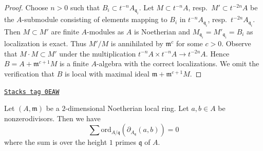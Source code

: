 \begin{proof}
Choose $n > 0$ such that $B_i \subset t^{-n}A_{\mathfrak q_i}$.
Let $M \subset t^{-n}A$, resp.\ $M' \subset t^{-2n}A$ be the
$A$-submodule consisting of elements mapping to $B_i$ in
$t^{-n}A_{\mathfrak q_i}$, resp.\ $t^{-2n}A_{\mathfrak q_i}$.
Then $M \subset M'$ are finite $A$-modules as $A$ is Noetherian
and $M_{\mathfrak q_i} = M'_{\mathfrak q_i} = B_i$ as localization
is exact. Thus $M'/M$ is annihilated by $\mathfrak m^c$ for some
$c > 0$. Observe that $M \cdot M \subset M'$ under the multiplication
$t^{-n}A \times t^{-n}A \to t^{-2n}A$. Hence
$B = A + \mathfrak m^{c + 1}M$ is a finite $A$-algebra with the correct
localizations. We omit the verification that $B$ is local with
maximal ideal $\mathfrak m + \mathfrak m^{c + 1}M$.
\end{proof}

\begin{lemma}
\label{chow-lemma-key-nonzerodivisors}
\href{https://stacks.math.columbia.edu/tag/0EAW}{\texttt{Stacks tag 0EAW}}

Let $(A, \mathfrak m)$ be a $2$-dimensional Noetherian local ring.
Let $a, b \in A$ be nonzerodivisors.
Then we have
$$
\sum
\text{ord}_{A/\mathfrak q}(\partial_{A_{\mathfrak q}}(a, b))
=
0
$$
where the sum is over the height $1$ primes $\mathfrak q$ of $A$.
\end{lemma}

